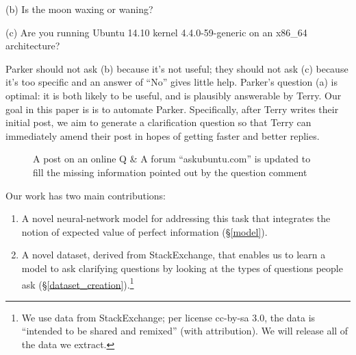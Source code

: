 \documentclass[11pt]{report}
\begin{document}
\textsf{\small(b) Is the moon waxing or waning?}

\textsf{\small(c) Are you running Ubuntu 14.10 kernel 4.4.0-59-generic on an x86\_64 architecture?}

\noindent
Parker should not ask (b) because it's not useful; they should not ask (c) because it's too specific and an answer of ``No'' gives little help.
Parker's question (a) is optimal: it is both likely to be useful, and is plausibly answerable by Terry.
Our goal in this paper is is to automate Parker.
Specifically, after Terry writes their initial post, we aim to generate a clarification question so that Terry can immediately amend their post in hopes of getting faster and better replies.
\begin{figure}
\centering
\setlength\fboxsep{1pt}
\setlength\fboxrule{0.5pt}
\caption{A post on an online Q \& A forum ``askubuntu.com'' is updated to fill the missing information pointed out by the question comment}
\label{askubuntu_post}
\end{figure}
%
Our work has two main contributions: 
\begin{enumerate}
\item A novel neural-network model for addressing this task that integrates the notion of expected value of perfect information (\S\ref{model}). %
\item A novel dataset, derived from StackExchange, that enables us to learn a model to ask clarifying questions by looking at the types of questions people ask (\S\ref{dataset_creation}).\footnote{We use data from StackExchange; per license cc-by-sa 3.0, the data is ``intended to be shared and remixed'' (with attribution). We will release all of the data we extract.}
\end{enumerate}
\end{document}
